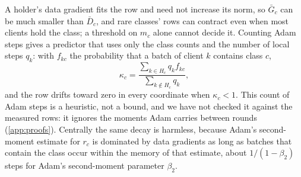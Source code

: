 A holder's data gradient fits the row and need not increase its norm, so $\bar G_c$ can be much smaller than
$\bar D_c$, and rare classes' rows can contract even when most clients hold the class; a threshold on $m_c$ alone cannot decide it. Counting Adam steps gives
a predictor that uses only the class counts and the number of local steps $q_k$: with $f_{kc}$ the probability that
a batch of client $k$ contains class $c$,
\begin{equation}\label{eq:kappa}
\kappa_c=\frac{\sum_{k\in H_c}q_k f_{kc}}{\sum_{k\notin H_c}q_k},
\end{equation}
and the row drifts toward zero in every coordinate when $\kappa_c<1$. This count of Adam steps is a heuristic, not
a bound, and we have not checked it against the measured rows: it ignores the moments Adam carries between rounds (\cref{app:proofs}). Centrally the same decay is
harmless, because Adam's second-moment estimate for $r_c$ is dominated by data gradients as long as batches that
contain the class occur within the memory of that estimate, about $1/(1-\beta_2)$ steps for Adam's second-moment
parameter $\beta_2$.

